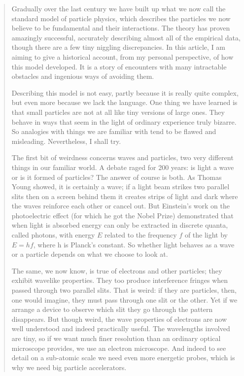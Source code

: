\begin{quote}
Gradually over the last century we have built up what we now call the standard model of particle physics, which describes the particles we now believe to be fundamental and their interactions. The theory has proven amazingly successful, accurately describing almost all of the empirical data, though there are a few tiny niggling discrepancies. In this article, I am aiming to give a historical account, from my personal perspective, of how this model developed. It is a story of encounters with many intractable obstacles and ingenious ways of avoiding them.

Describing this model is not easy, partly because it is really quite complex, but even more because we lack the language. One thing we have learned is that small particles are not at all like tiny versions of large ones. They behave in ways that seem in the light of ordinary experience truly bizarre. So analogies with things we are familiar with tend to be flawed and misleading. Nevertheless, I shall try.

The first bit of weirdness concerns waves and particles, two very different things in our familiar world. A debate raged for 200 years: is light a wave or is it formed of particles? The answer of course is both. As Thomas Young showed, it is certainly a wave; if a light beam strikes two parallel slits then on a screen behind them it creates strips of light and dark where the waves reinforce each other or cancel out. But Einstein’s work on the photoelectric effect (for which he got the Nobel Prize) demonstrated that when light is absorbed energy can only be extracted in discrete quanta, called photons, with energy $E$ related to the frequency $f$ of the light by $E = hf$, where h is Planck’s constant. So whether light behaves as a wave or a particle depends on what we choose to look at.

The same, we now know, is true of electrons and other particles; they exhibit wavelike properties. They too produce interference fringes when passed through two parallel slits. That is weird: if they are particles, then, one would imagine, they must pass through one slit or the other. Yet if we arrange a device to observe which slit they go through the pattern disappears. But though weird, the wave properties of electrons are now well understood and indeed practically useful. The wavelengths involved are tiny, so if we want much finer resolution than an ordinary optical microscope provides, we use an electron microscope. And indeed to see detail on a sub-atomic scale we need even more energetic probes, which is why we need big particle accelerators.


\end{quote}
